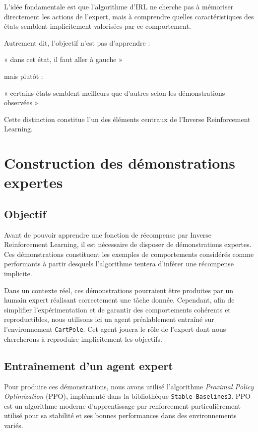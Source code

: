 \documentclass{article}
\begin{document}
L’idée fondamentale est que l’algorithme d’IRL ne cherche pas à mémoriser directement les actions de l’expert, mais à comprendre quelles caractéristiques des états semblent implicitement valorisées par ce comportement.

Autrement dit, l’objectif n’est pas d’apprendre :
\begin{center}
« dans cet état, il faut aller à gauche »
\end{center}

mais plutôt :
\begin{center}
« certains états semblent meilleurs que d’autres selon les démonstrations observées »
\end{center}

Cette distinction constitue l’un des éléments centraux de l’Inverse Reinforcement Learning.

\section{Construction des démonstrations expertes}

\subsection{Objectif}

Avant de pouvoir apprendre une fonction de récompense par Inverse Reinforcement Learning, il est nécessaire de disposer de démonstrations expertes. Ces démonstrations constituent les exemples de comportements considérés comme performants à partir desquels l’algorithme tentera d’inférer une récompense implicite.

Dans un contexte réel, ces démonstrations pourraient être produites par un humain expert réalisant correctement une tâche donnée. Cependant, afin de simplifier l’expérimentation et de garantir des comportements cohérents et reproductibles, nous utilisons ici un agent préalablement entraîné sur l’environnement \texttt{CartPole}. Cet agent jouera le rôle de l’expert dont nous chercherons à reproduire implicitement les objectifs.

\subsection{Entraînement d’un agent expert}

Pour produire ces démonstrations, nous avons utilisé l’algorithme \textit{Proximal Policy Optimization} (PPO), implémenté dans la bibliothèque \texttt{Stable-Baselines3}. PPO est un algorithme moderne d’apprentissage par renforcement particulièrement utilisé pour sa stabilité et ses bonnes performances dans des environnements variés.
\end{document}
